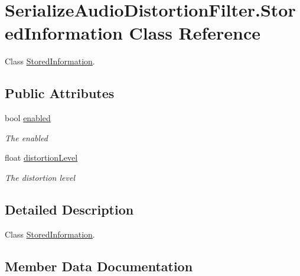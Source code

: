 \hypertarget{class_serialize_audio_distortion_filter_1_1_stored_information}{}\section{Serialize\+Audio\+Distortion\+Filter.\+Stored\+Information Class Reference}
\label{class_serialize_audio_distortion_filter_1_1_stored_information}


Class \hyperlink{class_serialize_audio_distortion_filter_1_1_stored_information}{Stored\+Information}.  


\subsection*{Public Attributes}
\begin{DoxyCompactItemize}
\item 
bool \hyperlink{class_serialize_audio_distortion_filter_1_1_stored_information_aafbf4022fa143520dd73a6c779fd3340}{enabled}
\begin{DoxyCompactList}\small\item\em The enabled \end{DoxyCompactList}\item 
float \hyperlink{class_serialize_audio_distortion_filter_1_1_stored_information_a96ca2c3e3736c0519a044198ae3397b2}{distortion\+Level}
\begin{DoxyCompactList}\small\item\em The distortion level \end{DoxyCompactList}\end{DoxyCompactItemize}


\subsection{Detailed Description}
Class \hyperlink{class_serialize_audio_distortion_filter_1_1_stored_information}{Stored\+Information}. 



\subsection{Member Data Documentation}
\mbox{\label{class_serialize_audio_distortion_filter_1_1_stored_information_a96ca2c3e3736c0519a044198ae3397b2}} 
